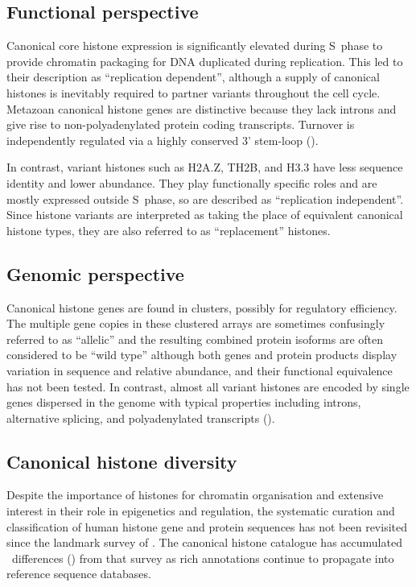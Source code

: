   \subsection{Functional perspective}

    Canonical core histone expression
    is significantly elevated during S~phase to provide chromatin packaging
    for DNA duplicated during replication.
    This led to their description as ``replication dependent'',
    although a supply of canonical histones is inevitably required
    to partner variants throughout the cell cycle.
    Metazoan canonical histone genes are distinctive
    because they lack introns and give rise to non-polyadenylated protein coding transcripts.
    Turnover is independently regulated via a highly
    conserved 3' stem-loop ().

    In contrast, variant histones such as H2A.Z, TH2B, and H3.3 have
    less sequence identity and lower abundance.
    They play functionally specific roles and are mostly expressed outside S~phase,
    so are described as ``replication independent''.
    Since histone variants are interpreted as taking the place
    of equivalent canonical histone types,
    they are also referred to as ``replacement'' histones.

  \subsection{Genomic perspective}

    Canonical histone genes are found in \NumberOfClusters{} clusters,
    possibly for regulatory efficiency.
    The multiple gene copies in these clustered arrays are
    sometimes confusingly referred to as ``allelic''
    and the resulting combined protein isoforms are often considered to be ``wild type''
    although both genes and protein products display
    variation in sequence and relative abundance,
    and their functional equivalence has not been tested.
    In contrast, almost all variant histones are encoded by single genes dispersed in the genome
    with typical properties including introns, alternative splicing,
    and polyadenylated transcripts ().

  \subsection{Canonical histone diversity}

    Despite the importance of histones for chromatin organisation and extensive interest
    in their role in epigenetics and regulation, the systematic
    curation and classification of human histone
    gene and protein sequences has not been revisited
    since the landmark survey of \citet{Marzluff02}.
    The canonical histone catalogue has accumulated
    \TotalChangesSinceReference{}~differences ()
    from that survey as rich annotations continue to propagate
    into reference sequence databases.

